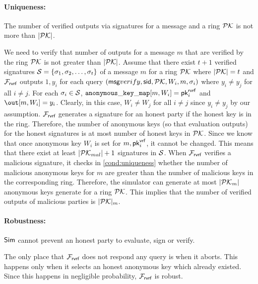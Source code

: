 \paragraph{Uniqueness:} The number of verified outputs via signatures for a message and a ring $ {\mathcal{PK}} $ is not more than $ |{\mathcal{PK}}| $.
 
 We need to verify that number of outputs for a message $ m $ that are verified by the ring $ {\mathcal{PK}} $ is not greater than $ |{\mathcal{PK}}| $.
Assume that there exist $ t + 1 $ verified signatures $ {\mathcal{S}} = \{\sigma_1, \sigma_2, \ldots, \sigma_t\} $ of a message $ m $ for a ring $ {\mathcal{PK}} $ where $ |{\mathcal{PK}}| = t $ and $ \mathcal{F}_{\textsf{rvrf}} $ outputs $ 1, y_i $ for each query $ (\mathsf{msg}{verify}, \textsf{sid}, {\mathcal{PK}}, W_i, m, \sigma_i) $ where $ y_i \neq y_j $ for all $ i \neq j $. For each $ \sigma_i \in {\ensuremath{\mathcal{S}}} $, $ \mathtt{anonymous\_key\_map}[m,W_i] = \mathsf{pk}^{\mathsf{rvrf}}_i $ and $ \out[m,W_i] = y_i $. Clearly, in this case, $ W_i \neq W_j $ for all $ i \neq j $ since $ y_i \neq y_j $ by our assumption. $ \mathcal{F}_{\textsf{rvrf}} $ generates a signature for an honest party if the honest key is in the ring. Therefore, the number of anonymous keys (so that evaluation outputs) for the honest signatures is at most number of honest keys in $ {\mathcal{PK}} $. Since we know that once anonymous key $ W_i $ is set for $ m, \mathsf{pk}^{\mathsf{vrf}}_i $, it cannot be changed. This means that there exist at least $ |{\mathcal{PK}}_{mal}| + 1 $ signatures in $ {\mathcal{S}} $. When $ \mathcal{F}_{\textsf{rvrf}} $ verifies a malicious signature, it checks in \ref{cond:uniqueness} whether the number of malicious anonymous keys for $ m $ are greater than the number of malicious keys in the corresponding ring. Therefore, the simulator can generate at most $ |{\mathcal{PK}}_m| $ anonymous keys generate for a ring $ {\mathcal{PK}} $. This implies that the number of verified outputs of malicious parties   is $ |{\mathcal{PK}}|_m $. 

\paragraph{Robustness:} $ \mathsf{Sim} $ cannot prevent an honest party to evaluate, sign or verify.

The only place that $ \mathcal{F}_{\textsf{rvrf}} $ does not respond any query is when it aborts. This happens only when it selects an honest anonymous key which already existed. Since this happens in negligible probability,  $ \mathcal{F}_{\textsf{rvrf}} $ is robust.

